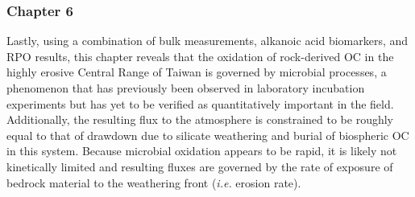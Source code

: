 \subsubsection{Chapter 6}

Lastly, using a combination of bulk measurements, alkanoic acid biomarkers, and RPO results, this chapter reveals that the oxidation of rock-derived OC in the highly erosive Central Range of Taiwan is governed by microbial processes, a phenomenon that has previously been observed in laboratory incubation experiments but has yet to be verified as quantitatively important in the field. Additionally, the resulting  flux to the atmosphere is constrained to be roughly equal to that of  drawdown due to silicate weathering and burial of biospheric OC in this system. Because microbial oxidation appears to be rapid, it is likely not kinetically limited and resulting  fluxes are governed by the rate of exposure of bedrock material to the weathering front (\textit{i.e.} erosion rate).
